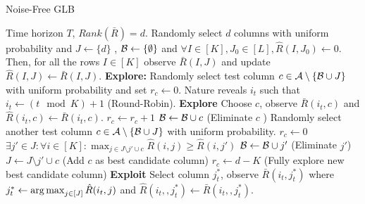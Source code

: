 \begin{algorithm}[!th]
\caption{Noise-Free GLB}
\label{alg:NFGLB}
\begin{algorithmic}[1]
 Time horizon $T$, $Rank(\bar{R}) = d$.
 Randomly select $d$ columns with uniform probability and $J\leftarrow \lbrace d \rbrace$ , $\mathcal{B} \leftarrow \lbrace\emptyset\rbrace$ and $\forall I\in [K], J_0\in [L], \hat{R}(I,J_0) \leftarrow 0$.
\State Then, for all the rows $I\in[K]$ observe $\bar{R}(I,J)$ and update  $\hat{R}(I,J) \leftarrow \bar{R}(I,J)$.
\State \textbf{Explore: } Randomly select test column $c \in \mathcal{A} \setminus \lbrace\mathcal{B} \cup J\rbrace$ with uniform probability and set $r_c \leftarrow 0$.
\State Nature reveals $i_t$ such that $i_t \leftarrow (t \mod K) + 1$ (Round-Robin).
 \textbf{Explore}
\State Choose $c$, observe $\bar{R}(i_t,c)$ and $\hat{R}(i_t,c)\leftarrow \bar{R}(i_t,c)$.
\State $r_c \leftarrow r_c + 1$
\Else
\ColElim
\State {} 
\State  $\mathcal{B} \leftarrow \mathcal{B} \cup c$ (Eliminate $c$ )
\State Randomly select another test column $c \in \mathcal{A} \setminus \lbrace\mathcal{B} \cup J\rbrace$ with uniform probability.
\State $r_c \leftarrow 0$
\Else
\State $\exists j'\in J: \forall i\in [K]: \max_{j\in J \setminus{ j'} \cup c} \hat{R}(i,j) \geq \hat{R}(i,j')$
\State $\mathcal{B} \leftarrow \mathcal{B} \cup j' $ (Eliminate $j'$)
\State $J\leftarrow J \setminus{ j'} \cup c$ (Add $c$ as best candidate column)
\State $r_c \leftarrow d - K $ (Fully explore new best candidate column)
\EndIf
\EndColElim
\EndIf
{} \textbf{Exploit}
\State  Select column $j_t^*$, observe $\bar{R}(i_t,j_t^*)$ where $j_t^* \leftarrow \mathop{\rm arg\,max}_{j\in[J]} {\hat{R}(i_t,j)}$ and $\hat{R}(i_t,,j_t^*)\leftarrow \bar{R}(i_t,,j_t^*)$.
\EndIf
\EndFor
\end{algorithmic}
\end{algorithm}


